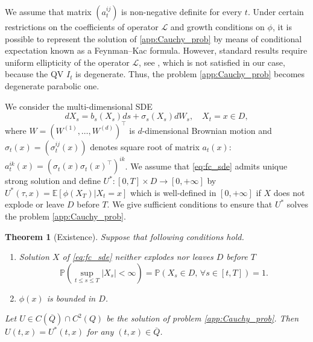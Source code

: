 \documentclass[11pt,a4paper] {article}
\newtheorem{theorem}{Theorem}[section]
\begin{document}
We assume that  matrix $(a_t^{ij})$ is non-negative definite for every $t$.
Under certain restrictions on the coefficients of operator $\mathcal{L}$ and growth conditions on $\phi$, it is possible to  represent the solution of \eqref{app:Cauchy_prob} by means of conditional expectation known as a Feynman--Kac formula. However, standard results require uniform ellipticity of the operator $\mathcal{L}$, see \cite{Friedman75}, which is not satisfied in our case, because the QV $I_{t}$ is degenerate. Thus, the problem \eqref{app:Cauchy_prob} becomes degenerate parabolic one.  

We consider the multi-dimensional SDE
\begin{equation}\label{eq:fc_sde}
dX_s=b_s(X_s)ds + \sigma_s(X_s)dW_s,\quad X_t=x\in D,
\end{equation}
where $W=(W^{(1)},\ldots, W^{(d)})^\top$ is $d$-dimensional Brownian motion and  $\sigma_t(x)=(\sigma^{ij}_t(x))$ denotes square root of matrix $a_t(x)$: $a^{ik}_t(x)=\left(\sigma_t(x)\sigma_t(x)^\top\right)^{ik}$.
We assume that \eqref{eq:fc_sde} admits unique strong solution and define $U^*: [0,T]\times D\to [0, +\infty]$ by
$
U^*(\tau,x)=\mathbb{E}\left[\left.\phi(X_T)\right|X_t=x\right]
$
which is well-defined in $[0,+\infty]$ if $X$ does not explode or leave $D$ before $T$. 
We give sufficient conditions to ensure that $U^*$ solves the problem \eqref{app:Cauchy_prob}. 

\begin{theorem}[Existence]\label{thm:fc_exten}
Suppose that following conditions hold.
\begin{enumerate}%
\item\label{fc:explosion} Solution $X$ of \eqref{eq:fc_sde} neither explodes nor leaves $D$ before $T$
\begin{equation*}
\mathbb{P}\left(\sup_{t\le s\le T}|X_s|<\infty\right)=\mathbb{P}\left(X_s\in D,\, \forall s\in [t,T]\right)=1.
\end{equation*}
\item\label{fc:bounded} $\phi(x)$ is bounded in $D$.
\end{enumerate}
Let $U\in C(\overline{Q})\cap C^2(Q)$ be the solution of problem \eqref{app:Cauchy_prob}. Then $U(t,x)=U^*(t,x)$ for any $(t,x)\in \overline{Q}$. 
\end{theorem}
\end{document}
